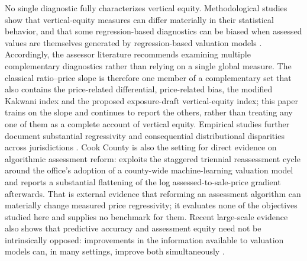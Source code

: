 \documentclass[10pt]{article}
\theoremstyle{definition}
\newcommand{\1}{\mathbf{1}}
\begin{document}
{No single diagnostic fully characterizes vertical equity. Methodological studies show that vertical-equity measures can differ materially in their statistical behavior, and that some regression-based diagnostics can be biased when assessed values are themselves generated by regression-based valuation models} \cite{IAAO2023VerticalReview,McMillenSingh2023}. {Accordingly, the assessor literature recommends examining multiple complementary diagnostics rather than relying on a single global measure.} The classical ratio--price slope is therefore one member of a complementary set that also contains the price-related differential, price-related bias, the modified Kakwani index and the proposed exposure-draft vertical-equity index; this paper trains on the slope and continues to report the others, rather than treating any one of them as a complete account of vertical equity.  {Empirical studies further document substantial regressivity and consequential distributional disparities across jurisdictions} \cite{Berry2021,AvenancioLeonHoward2022}. Cook County is also the setting for direct evidence on algorithmic assessment reform: \textcite{Liu2026} exploits the staggered triennial reassessment cycle around the office's adoption of a county-wide machine-learning valuation model and reports a substantial flattening of the log assessed-to-sale-price gradient afterwards. That is external evidence that reforming an assessment algorithm can materially change measured price regressivity; it evaluates none of the objectives studied here and supplies no benchmark for them. {Recent large-scale evidence also shows that predictive accuracy and assessment equity need not be intrinsically opposed: improvements in the information available to valuation models can, in many settings, improve both simultaneously \cite{SmithEtAl2026}.}
\end{document}
